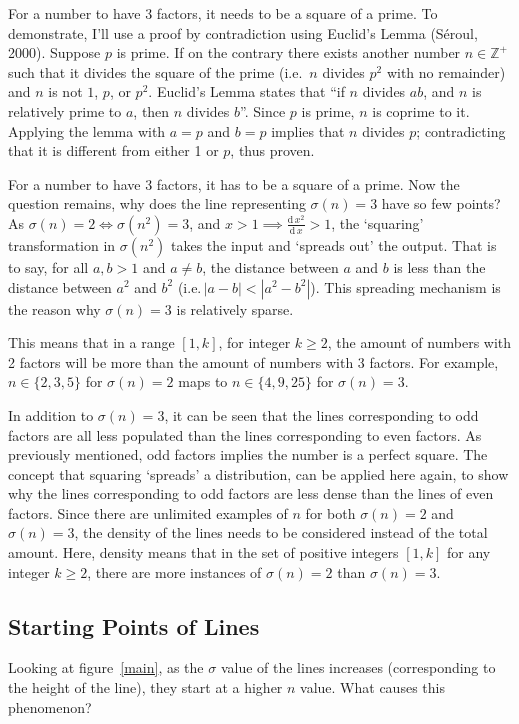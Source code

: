 \documentclass[12pt]{article}
\begin{document}
			For a number to have 3 factors, it needs to be a square of a prime. To demonstrate, I'll use a proof by contradiction using Euclid's Lemma (S\'eroul, 2000). Suppose $p$ is prime. If on the contrary there exists another number $n\in\mathbb{Z}^+$ such that it divides the square of the prime (i.e.\ $n$ divides $p^2$ with no remainder) and $n$ is not $1$, $p$, or $p^2$. Euclid's Lemma states that ``if $n$ divides $ab$, and $n$ is relatively prime to $a$, then $n$ divides $b$''. Since $p$ is prime, $n$ is coprime to it. Applying the lemma with $a=p$ and $b=p$ implies that $n$ divides $p$; contradicting that it is different from either 1 or $p$, thus proven.

			For a number to have 3 factors, it has to be a square of a prime. Now the question remains, why does the line representing $\sigma(n)=3$ have so few points?
			As $\sigma(n)=2\iff \sigma(n^2)=3$, and $\displaystyle{x>1\implies \frac{\text{d}\,x^2}{\text{d}\,x}>1}$, the `squaring' transformation in $\sigma(n^2)$ takes the input and `spreads out' the output. That is to say, for all $a,b>1$ and $a\neq b$, the distance between $a$ and $b$ is less than the distance between $a^2$ and $b^2$ (i.e.\,$|a-b|<|a^2-b^2|$). This spreading mechanism is the reason why $\sigma(n)=3$ is relatively sparse.

			This means that in a range $[1,k]$, for integer $k\geq 2$, the amount of numbers with 2 factors will be more than the amount of numbers with 3 factors. For example, $n\in\{2,3,5\}$ for $\sigma(n)=2$ maps to $n\in\{4,9,25\}$ for $\sigma(n)=3$.

			In addition to $\sigma(n)=3$, it can be seen that the lines corresponding to odd factors are all less populated than the lines corresponding to even factors. As previously mentioned, odd factors implies the number is a perfect square. The concept that squaring `spreads' a distribution, can be applied here again, to show why the lines corresponding to odd factors are less dense than the lines of even factors. Since there are unlimited examples of $n$ for both $\sigma(n)=2$ and $\sigma(n)=3$, the density of the lines needs to be considered instead of the total amount. Here, density means that in the set of positive integers $[1,k]$ for any integer $k\geq 2$, there are more instances of $\sigma(n)=2$ than $\sigma(n)=3$.
		\subsection{Starting Points of Lines\label{TPRsec}}
			Looking at figure~\ref{main}, as the $\sigma$ value of the lines increases (corresponding to the height of the line), they start at a higher $n$ value. What causes this phenomenon?
\end{document}
